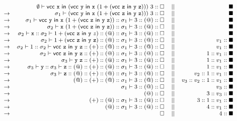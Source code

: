 \[
  \footnotesize
\begin{array}{lrcr}
& \emptyset\vdash\textsf{vcc}\ \cx\ \textsf{in}\ (\textsf{vcc}\ \cy\ \textsf{in}\
\cx\ (1+(\textsf{vcc}\ \cz\ \textsf{in}\ \cy\ \cz)))\ 3
::\square &||& \blacksquare \\
\rightarrow& \sigma_1\vdash(\textsf{vcc}\ \cy\ \textsf{in}\ \cx\ (1+(\textsf{vcc}\ \cz\
\textsf{in}\ \cy\ \cz)))\ 3
::\square &||& \blacksquare \\
\rightarrow& \sigma_1\vdash\textsf{vcc}\ \cy\ \textsf{in}\ \cx\ (1+(\textsf{vcc}\ \cz\
\textsf{in}\ \cy\ \cz))::\sigma_1\vdash3::(@)
::\square &||& \blacksquare \\
\rightarrow& \sigma_2\vdash \cx\ (1+(\textsf{vcc}\ \cz\ \textsf{in}\ \cy\
\cz))::\sigma_1\vdash3::(@)
::\square &||& \blacksquare \\
\rightarrow& \sigma_2\vdash \cx::\sigma_2\vdash 1+(\textsf{vcc}\ \cz\ \textsf{in}\ \cy\
z)::(@)::\sigma_1\vdash3::(@)
::\square &||& \blacksquare \\
\rightarrow& \sigma_2\vdash 1+(\textsf{vcc}\ \cz\ \textsf{in}\ \cy\
\cz)::(@)::\sigma_1\vdash3::(@)
::\square &||& v_1::\blacksquare \\
\rightarrow& \sigma_2\vdash 1::\sigma_2\vdash\textsf{vcc}\ \cz\ \textsf{in}\ \cy\
\cz::(+)::(@)::\sigma_1\vdash3::(@)
::\square &||& v_1::\blacksquare \\
\rightarrow& \sigma_2\vdash\textsf{vcc}\ \cz\ \textsf{in}\ \cy\
\cz::(+)::(@)::\sigma_1\vdash3::(@)
::\square &||& 1::v_1::\blacksquare \\
\rightarrow& \sigma_3\vdash \cy\ \cz::(+)::(@)::\sigma_1\vdash3::(@)
::\square &||& 1::v_1::\blacksquare \\
\rightarrow& \sigma_3\vdash \cy::\sigma_3\vdash
\cz::(@)::(+)::(@)::\sigma_1\vdash3::(@)
::\square &||& 1::v_1::\blacksquare \\
\rightarrow& \sigma_3\vdash \cz::(@)::(+)::(@)::\sigma_1\vdash3::(@)
::\square &||& v_2::1::v_1::\blacksquare \\
\rightarrow& (@)::(+)::(@)::\sigma_1\vdash3::(@)
::\square &||& v_3::v_2::1::v_1::\blacksquare \\
\rightarrow& \sigma_1\vdash3::(@)
::\square &||& v_3::\blacksquare \\
\rightarrow& (@)
::\square &||& 3::v_3::\blacksquare \\
\rightarrow& (+)::(@)::\sigma_1\vdash3::(@)
::\square &||& 3::1::v_1::\blacksquare \\
\rightarrow& (@)::\sigma_1\vdash3::(@)
::\square &||& 4::v_1::\blacksquare \\
\rightarrow& \square &||& 4::\blacksquare \\
\end{array}
\]

